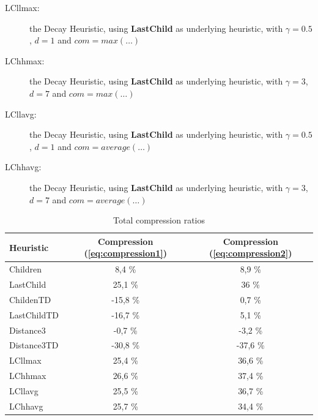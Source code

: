 \documentclass{llncs}
\begin{document}
\begin{description}
	\item[LCllmax:] the Decay Heuristic, using \textbf{LastChild} as underlying heuristic, with $\gamma = 0.5$, $d = 1$ and $com = max(\ldots)$
	\item[LChhmax:] the Decay Heuristic, using \textbf{LastChild} as underlying heuristic, with $\gamma = 3$, $d = 7$ and $com = max(\ldots)$
	\item[LCllavg:] the Decay Heuristic, using \textbf{LastChild} as underlying heuristic, with $\gamma = 0.5$, $d = 1$ and $com = average(\ldots)$
	\item[LChhavg:] the Decay Heuristic, using \textbf{LastChild} as underlying heuristic, with $\gamma = 3$, $d = 7$ and $com = average(\ldots)$
\end{description}


 \begin{table}[tb]
   \caption{Total compression ratios}
   \label{tab:average1}
   \centering
   \begin{tabular}{l|c|c}
     \toprule
     Heuristic & Compression (\ref{eq:compression1}) & Compression (\ref{eq:compression2})\\
     \midrule
     Children                &  8,4 \%  &  8,9 \% \\
     LastChild               &  25,1 \% & 36 \% \\
		 ChildenTD               &  -15,8 \% & 0,7  \% \\
		 LastChildTD             & -16,7 \% & 5,1 \% \\
		 Distance3             & -0,7 \% & -3,2  \% \\
		 Distance3TD              & -30,8 \% & -37,6  \% \\
		 LCllmax                 & 25,4 \% & 36,6  \% \\
		 LChhmax                 & 26,6 \% & 37,4 \% \\
		 LCllavg                 & 25,5 \% & 36,7 \% \\ 
		 LChhavg                 & 25,7 \% & 34,4 \% \\
     \bottomrule
   \end{tabular}
 \end{table}
\end{document}
